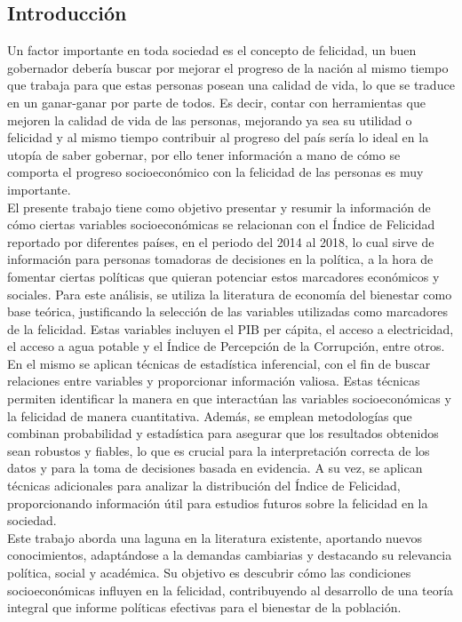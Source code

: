 \subsection{Introducción}

Un factor importante en toda sociedad es el concepto de felicidad, un buen gobernador debería buscar por mejorar el progreso de la nación al mismo tiempo que trabaja para que estas personas posean una calidad de vida, lo que se traduce en un ganar-ganar por parte de todos. Es decir, contar con herramientas que mejoren la calidad de vida de las personas, mejorando ya sea su utilidad o felicidad y al mismo tiempo contribuir al progreso del país sería lo ideal en la utopía de saber gobernar, por ello tener información a mano de cómo se comporta el progreso socioeconómico con la felicidad de las personas es muy importante. \\

El presente trabajo tiene como objetivo presentar y resumir la información de cómo ciertas variables socioeconómicas se relacionan con el Índice de Felicidad reportado por diferentes países, en el periodo del 2014 al 2018, lo cual sirve de información para personas tomadoras de decisiones en la política, a la hora de fomentar ciertas políticas que quieran potenciar estos marcadores económicos y sociales. Para este análisis, se utiliza la literatura de economía del bienestar como base teórica, justificando la selección de las variables utilizadas como marcadores de la felicidad. Estas variables incluyen el PIB per cápita, el acceso a electricidad, el acceso a agua potable y el Índice de Percepción de la Corrupción, entre otros. \\

En el mismo se aplican técnicas de estadística inferencial, con el fin de buscar relaciones entre variables y proporcionar información valiosa. Estas técnicas permiten identificar la manera en que interactúan las variables socioeconómicas y la felicidad de manera cuantitativa. Además, se emplean metodologías que combinan probabilidad y estadística para asegurar que los resultados obtenidos sean robustos y fiables, lo que es crucial para la interpretación correcta de los datos y para la toma de decisiones basada en evidencia. A su vez, se aplican técnicas adicionales para analizar la distribución del Índice de Felicidad, proporcionando información útil para estudios futuros sobre la felicidad en la sociedad. \\

Este trabajo aborda una laguna en la literatura existente, aportando nuevos conocimientos, adaptándose a la demandas cambiarias y destacando su relevancia política, social y académica. Su objetivo es descubrir cómo las condiciones socioeconómicas influyen en la felicidad, contribuyendo al desarrollo de una teoría integral que informe políticas efectivas para el bienestar de la población. \\


